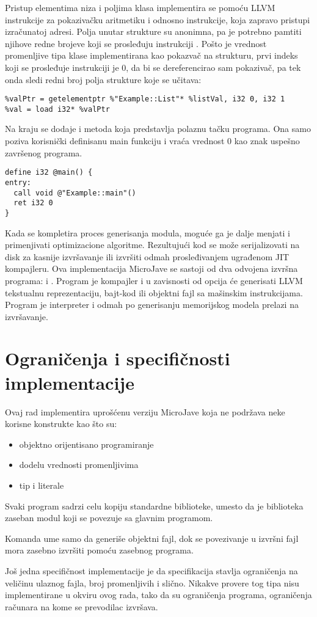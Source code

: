 Pristup elementima niza i poljima klasa implementira se pomoću LLVM instrukcije za pokazivačku aritmetiku  i  odnosno  instrukcije, koja zapravo pristupi izračunatoj adresi.
Polja unutar strukture su anonimna, pa je potrebno pamtiti njihove redne brojeve koji se prosleđuju instrukciji .
Pošto je vrednost promenljive tipa klase implementirana kao pokazvač na strukturu, prvi indeks koji se prosleđuje  instrukciji je 0, da bi se dereferencirao sam pokazivač, pa tek onda sledi redni broj polja strukture koje se učitava:

\begin{lstlisting}
%valPtr = getelementptr %"Example::List"* %listVal, i32 0, i32 1
%val = load i32* %valPtr
\end{lstlisting}

Na kraju se dodaje i metoda  koja predstavlja polaznu tačku programa.
Ona samo poziva korisnički definisanu main funkciju i vraća vrednost 0 kao znak uspešno završenog programa.

\begin{lstlisting}
define i32 @main() {
entry:
  call void @"Example::main"()
  ret i32 0
}
\end{lstlisting}

Kada se kompletira proces generisanja modula, moguće ga je dalje menjati i primenjivati optimizacione algoritme.
Rezultujući kod se može serijalizovati na disk za kasnije izvršavanje ili izvršiti odmah prosleđivanjem ugrađenom JIT kompajleru.
Ova implementacija MicroJave se sastoji od dva odvojena izvršna programa:  i .
Program  je kompajler i u zavisnosti od opcija će generisati LLVM tekstualnu reprezentaciju, bajt-kod ili objektni fajl sa mašinskim instrukcijama.
Program  je interpreter i odmah po generisanju memorijskog modela prelazi na izvršavanje.

\section{Ograničenja i specifičnosti implementacije}

Ovaj rad implementira uprošćenu verziju MicroJave koja ne podržava neke korisne konstrukte kao što su: 
\begin{itemize}
\item objektno orijentisano programiranje
\item dodelu  vrednosti promenljivima
\item {} tip i literale
\end{itemize}

Svaki program sadrzi celu kopiju standardne biblioteke, umesto da je biblioteka zaseban modul koji se povezuje sa glavnim programom.

Komanda  ume samo da generiše objektni fajl, dok se povezivanje u izvršni fajl mora zasebno izvršiti pomoću zasebnog programa.

Još jedna specifičnost implementacije je da specifikacija stavlja ograničenja na veličinu ulaznog fajla, broj promenljivih i slično.
Nikakve provere tog tipa nisu implementirane u okviru ovog rada, tako da su ograničenja programa, ograničenja računara na kome se prevodilac izvršava.
